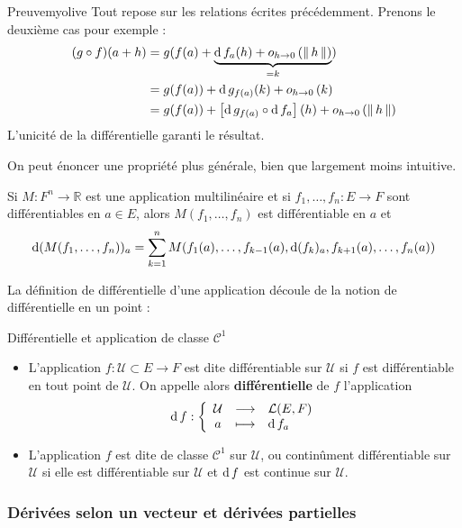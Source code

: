     \begin{demo}{Preuve}{myolive}
        Tout repose sur les relations écrites précédemment. Prenons le deuxième cas pour exemple : 
        \begin{align*}
            (g \circ f)(a + h) 
            &= g(f(a) + \underbrace{\operatorname{d} f_a(h) + o_{h \rightarrow 0} \left(\left\lVert \,h \, \right\rVert\right)}_{=k}) \\
            &= g(f(a)) + \operatorname{d} g_{f(a)}(k) + o_{h \rightarrow 0} \left(k\right) \\
            &= g(f(a)) + \left[\operatorname{d} g_{f(a)} \circ \operatorname{d} f_a\right](h) + o_{h \rightarrow 0} \left(\left\lVert \,h \, \right\rVert\right)
        \end{align*}
        L’unicité de la différentielle garanti le résultat.
    \end{demo}

    On peut énoncer une propriété plus générale, bien que largement moins intuitive.

    \begin{prop}{}{}
        Si $M : F^n \to \mathbb{R}$ est une application multilinéaire et si $f_1,\ldots,f_n : E \to F$ sont différentiables en $a \in E$, alors $M(f_1,\ldots,f_n)$ est différentiable en $a$ et 
        \[ \operatorname{d} (M(f_1,\ldots,f_n))_a = \sum_{k=1}^{n} M(f_1(a), \ldots, f_{k-1}(a), \operatorname{d}(f_k)_a, f_{k+1}(a), \ldots, f_n(a)) \]   
    \end{prop}

    La définition de différentielle d’une application découle de la notion de différentielle en un point : 

    \begin{defi}{Différentielle et application de classe $\mathcal{C}^1$}{}
        \begin{itemize}
            \item L’application $f : \mathcal{U} \subset E \to F$ est dite différentiable sur $\mathcal{U}$ si $f$ est différentiable en tout point de $\mathcal{U}$. On appelle alors \textbf{différentielle} de $f$ l’application 
            \[ \fonction{\d f}{\mathcal{U}}{\mathcal{L}(E,F)}{a}{\d f_a} \]
            \item L’application $f$ est dite de classe $\mathcal{C}^1$ sur $\mathcal{U}$, ou continûment différentiable sur $\mathcal{U}$ si elle est différentiable sur $\mathcal{U}$ et $\operatorname{d} f$ est continue sur $\mathcal{U}$. 
        \end{itemize}
    \end{defi}

    \subsubsection{Dérivées selon un vecteur et dérivées partielles}

